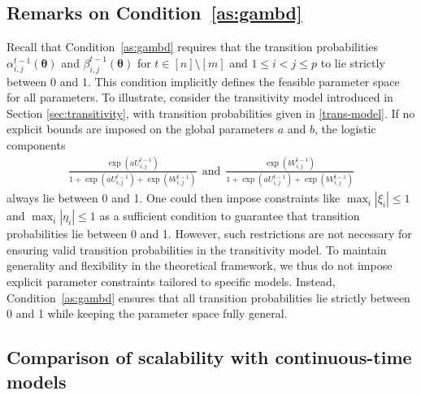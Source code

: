 \documentclass[12pt]{article}
\newcommand{\btheta}{\boldsymbol \theta}
\newcommand{\0}{{\bf 0}}
\begin{document}
\subsection{Remarks on Condition~\ref{as:gambd}}

Recall that Condition~\ref{as:gambd} requires that the transition probabilities $\alpha_{i,j}^{t-1}(\btheta)$  and $\beta_{i,j}^{t-1}(\btheta)$ for $t\in[n]\setminus[m]$ and $1\leq i<j\leq p$ to lie strictly between 0 and 1. This condition implicitly defines the feasible parameter space for all parameters. To illustrate, consider the transitivity model introduced in Section \ref{sec:transitivity}, with transition probabilities given in \eqref{trans-model}.  If no explicit bounds are imposed on the global parameters $a$ and $b$, the logistic components 
\begin{align*}
    \frac{\exp(a U_{i,j}^{t-1}) }{1+ \exp(a U_{i,j}^{t-1})+ \exp(b V_{i,j}^{t-1})}~~\text{and}~~\frac{ \exp(b V_{i,j}^{t-1})}  {1+ \exp(a U_{i,j}^{t-1})+ \exp(b V_{i,j}^{t-1})}
\end{align*}
always lie between 0 and 1. One could then impose constraints
like $\max_i|\xi_i| \le 1$ and $\max_i|\eta_i| \le 1$ as a sufficient condition to guarantee that transition probabilities lie between 0 and 1. 
However, such restrictions are not necessary for ensuring valid transition probabilities in the transitivity model.
To maintain generality and flexibility in the theoretical framework, we thus do not impose explicit parameter constraints tailored to specific models. Instead, Condition~\ref{as:gambd}  ensures that all transition probabilities lie strictly between 0 and 1 while keeping the parameter space fully general.


\subsection{Comparison of scalability with continuous-time models}
\end{document}
